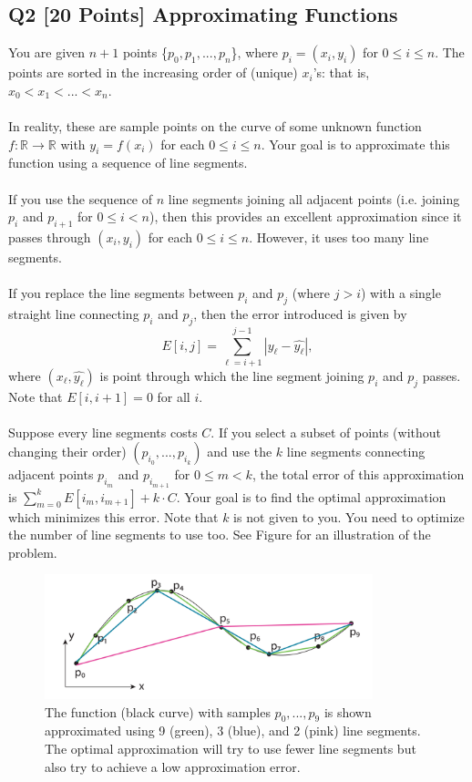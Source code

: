 \documentclass[10pt]{article}
\begin{document}
\begin{enumerate}
\begin{mdframed}
        
    \end{mdframed}
\end{enumerate}
\subsection*{Q2 [20 Points] Approximating Functions}
You are given $n + 1$ points \{$p_0, p_1, ..., p_n$\}, where $p_i = (x_i, y_i)$ for $0 \leq i \leq n$. The points are sorted in the increasing order of (unique) $x_i$’s: that is, $x_0 < x_1 < ... < x_n$.\\
\\
In reality, these are sample points on the curve of some unknown function $f: \mathbb{R} \rightarrow \mathbb{R}$ with $y_i = f(x_i)$ for each $0 \leq i \leq n$. Your goal is to approximate this function using a sequence of line segments.\\
\\
If you use the sequence of $n$ line segments joining all adjacent points (i.e. joining $p_i$ and $p_{i+1}$ for $0 \leq i < n$), then this provides an excellent approximation since it passes through $(x_i, y_i)$ for each
$0 \leq i \leq n$. However, it uses too many line segments.\\
\\
If you replace the line segments between $p_i$ and $p_j$ (where $j > i$) with a single straight line connecting $p_i$ and $p_j$, then the error introduced is given by
\[E[i, j] = \sum_{\ell = i + 1}^{j - 1} |y_{\ell} - \hat{y_{\ell}}|,\]
where $(x_{\ell}, \hat{y_{\ell}})$ is point through which the line segment joining $p_i$ and $p_j$ passes. Note that $E[i, i+1] = 0$ for all $i$.\\
\\
Suppose every line segments costs $C$. If you select a subset of points (without changing their order) $(p_{i_0},...,p_{i_k})$ and use the $k$ line segments connecting adjacent points $p_{i_m}$ and $p_{i_{m+1}}$ for $0 \leq m < k$, the total error of this approximation is $\sum_{m=0}^{k}E[i_m, i_{m+1}] + k \cdot C$. Your goal is to find the optimal approximation which minimizes this error. Note that $k$ is not given to you. You need to optimize
the number of line segments to use too. See Figure for an illustration of the problem.\\
\begin{figure}[H]
    \centering
    \includegraphics[width=0.85\textwidth]{A2_2.png}
    \caption{The function (black curve) with samples $p_0, ..., p_9$ is shown approximated using 9 (green), 3 (blue), and 2 (pink) line segments. The optimal approximation will try to use fewer line segments but also try to achieve a low approximation error.}
\end{figure}
\end{document}
